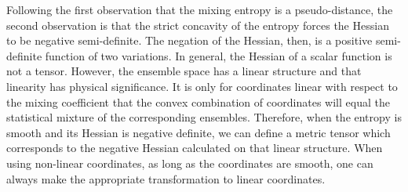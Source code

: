 Following the first observation that the mixing entropy is a pseudo-distance, the second observation is that the strict concavity of the entropy forces the Hessian to be negative semi-definite. The negation of the Hessian, then, is a positive semi-definite function of two variations. In general, the Hessian of a scalar function is not a tensor. However, the ensemble space has a linear structure and that linearity has physical significance. It is only for coordinates linear with respect to the mixing coefficient that the convex combination of coordinates will equal the statistical mixture of the corresponding ensembles. Therefore, when the entropy is smooth and its Hessian is negative definite, we can define a metric tensor which corresponds to the negative Hessian calculated on that linear structure. When using non-linear coordinates, as long as the coordinates are smooth, one can always make the appropriate transformation to linear coordinates.

